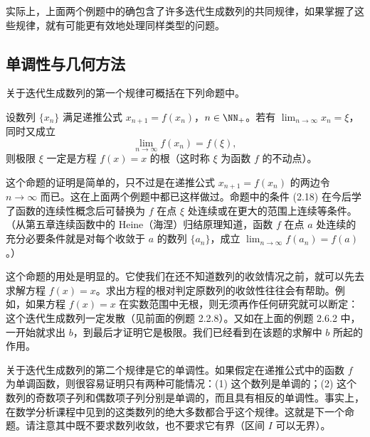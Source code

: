 实际上，上面两个例题中的确包含了许多迭代生成数列的共同规律，如果掌握了这些规律，就有可能更有效地处理同样类型的问题。

\subsection{单调性与几何方法}

关于迭代生成数列的第一个规律可概括在下列命题中。

\begin{xproposition}[2.6.1（第一律）]
设数列 $\{x_n\}$ 满足递推公式 $x_{n+1}=f(x_n)$，$n\in\NN_+$。若有 $\displaystyle\lim_{n\to\infty}x_n=\xi$，同时又成立
\begin{equation}
  \lim_{n\to\infty}f(x_n)=f(\xi),
  \tag{2.18}
  \label{eq:2.18}
\end{equation}
则极限 $\xi$ 一定是方程 $f(x)=x$ 的根（这时称 $\xi$ 为函数 $f$ 的不动点）。
\end{xproposition}

\begin{xremark}
这个命题的证明是简单的，只不过是在递推公式 $x_{n+1}=f(x_n)$ 的两边令 $n\to\infty$ 而已。这在上面两个例题中都已这样做过。命题中的条件 (2.18) 在今后学了函数的连续性概念后可替换为 $f$ 在点 $\xi$ 处连续或在更大的范围上连续等条件。（从第五章连续函数中的 Heine（海涅）归结原理知道，函数 $f$ 在点 $a$ 处连续的充分必要条件就是对每个收敛于 $a$ 的数列 $\{a_n\}$，成立 $\displaystyle\lim_{n\to\infty}f(a_n)=f(a)$。）

这个命题的用处是明显的。它使我们在还不知道数列的收敛情况之前，就可以先去求解方程 $f(x)=x$。求出方程的根对判定原数列的收敛性往往会有帮助。例如，如果方程 $f(x)=x$ 在实数范围中无根，则无须再作任何研究就可以断定：这个迭代生成数列一定发散（见前面的例题 2.2.8）。又如在上面的例题 2.6.2 中，一开始就求出 $b$，到最后才证明它是极限。我们已经看到在该题的求解中 $b$ 所起的作用。
\end{xremark}

关于迭代生成数列的第二个规律是它的单调性。如果假定在递推公式中的函数 $f$ 为单调函数，则很容易证明只有两种可能情况：(1) 这个数列是单调的；(2) 这个数列的奇数项子列和偶数项子列分别是单调的，而且具有相反的单调性。事实上，在数学分析课程中见到的这类数列的绝大多数都合乎这个规律。这就是下一个命题。请注意其中既不要求数列收敛，也不要求它有界（区间 $I$ 可以无界）。


